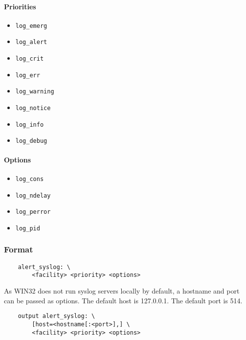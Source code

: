 \documentclass[english]{report}
\newenvironment{note}{
\samepage
    \vspace{10pt}{\textsf{
        {\hspace{7pt}\Huge{$\triangle$\hspace{-12.5pt}{\Large{$^!$}}}}\hspace{5pt}
        {\Large{NOTE}}
    }
    }
   \begin{center}
    \par\vspace{-17pt}

    \begin{lrbox}{\savepar}
    \begin{minipage}[r]{6in}
}
{
    \end{minipage}
    \end{lrbox}
    \fbox{
        \usebox{
            \savepar
	}
    }
    \par\vskip10pt
    \end{center}
}
\newenvironment{note}{
        \begin{rawhtml}
        <p><table border="1"><tr><td><b>
        Note:&nbsp;&nbsp;</b>
        \end{rawhtml}
}{
        \begin{rawhtml}
        </b></td></tr></table></p>
        \end{rawhtml}
}
\begin{document}
\paragraph{Priorities}

\begin{itemize}
\item \texttt{log\_emerg} 
\item \texttt{log\_alert}
\item \texttt{log\_crit}
\item \texttt{log\_err}
\item \texttt{log\_warning} 
\item \texttt{log\_notice}
\item \texttt{log\_info}
\item \texttt{log\_debug}
\end{itemize}

\paragraph{Options}

\begin{itemize}
\item \texttt{log\_cons} 
\item \texttt{log\_ndelay}
\item \texttt{log\_perror}
\item \texttt{log\_pid}
\end{itemize}

\subsubsection{Format}

\begin{verbatim}
    alert_syslog: \
        <facility> <priority> <options>
\end{verbatim}

\begin{note}

As WIN32 does not run syslog servers locally by default, a hostname and port
can be passed as options.  The default host is 127.0.0.1.  The default port is
514.

\end{note}

\begin{verbatim}
    output alert_syslog: \
        [host=<hostname[:<port>],] \
        <facility> <priority> <options>
\end{verbatim}
\end{document}

